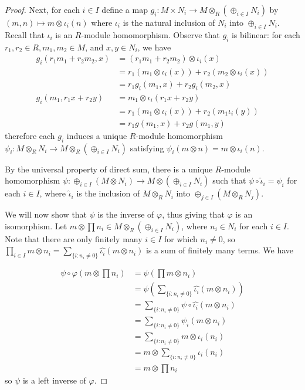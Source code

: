 \documentclass[10pt]{article}
\begin{document}
\begin{enumerate}
\begin{proof}
Next, for each $i \in I$ define a map $g_i: M \times N_i \rightarrow M \otimes_R (\oplus_{i \in I} N_i)$ by $(m, n) \mapsto m \otimes \iota_i (n)$ where $\iota_i$ is the natural inclusion of $N_i$ into $\oplus_{i \in I} N_i$.  Recall that $\iota_i$ is an $R$-module homomorphism.  Observe that $g_i$ is bilinear: for each $r_1, r_2 \in R, m_1, m_2 \in M$, and $x,y \in N_i$, we have
\begin{align*}
g_i(r_1m_1 + r_2m_2, x)
&=
(r_1m_1 + r_2m_2) \otimes \iota_i(x)
\\
&= r_1 \left( m_1 \otimes \iota_i(x) \right) + r_2 \left( m_2 \otimes \iota_i(x) \right)
\\
&= r_1 g_i(m_1, x) + r_2 g_i(m_2, x)
\\
g_i(m_1, r_1 x + r_2 y)
&=
m_1 \otimes \iota_i(r_1 x + r_2 y)
\\
&= r_1 \left( m_1 \otimes \iota_i(x) \right) + r_2 \left( m_1 \iota_i(y) \right)
\\
&= r_1 g(m_1, x) + r_2 g(m_1, y)
\end{align*}
therefore each $g_i$ induces a unique $R$-module homomorphism $\psi_i : M \otimes_R N_i \rightarrow M \otimes_R (\oplus_{i \in I} N_i)$ satisfying $\psi_i ( m \otimes n) = m \otimes \iota_i(n)$.

By the universal property of direct sum, there is a unique $R$-module homomorphism $\psi : \oplus_{i \in I} (M \otimes N_i) \rightarrow M \otimes (\oplus_{i \in I} N_i)$ such that $\psi \circ \hat{\iota}_i = \psi_i$ for each $i \in I$, where $\hat{\iota}_i$ is the inclusion of $M \otimes_R N_i$ into $\oplus_{j \in I} (M \otimes_R N_j)$.

We will now show that $\psi$ is the inverse of $\varphi$, thus giving that $\varphi$ is an isomorphism.  Let $m \otimes \prod n_i \in M \otimes_R (\oplus_{i \in I} N_i)$, where $n_i \in N_i$ for each $i \in I$.  Note that there are only finitely many $i \in I$ for which $n_i \neq 0$, so $\prod_{i \in I} m \otimes n_i = \sum\limits_{\{i  : n_i \neq 0 \}} \hat{\iota_i}(m \otimes n_i)$ is a sum of finitely many terms.  We have

\begin{align*}
\psi \circ \varphi \left( m \otimes \prod n_i \right)
&=
\psi \left( \prod m \otimes n_i \right)
\\
&= \psi \left( \sum\limits_{\{i  : n_i \neq 0 \}} \hat{\iota_i} (m \otimes n_i) \right)
\\
&= \sum\limits_{\{i  : n_i \neq 0 \}} \psi \circ \hat{\iota_i} (m \otimes n_i)
\\
&= \sum\limits_{\{i  : n_i \neq 0 \}} \psi_i (m \otimes n_i)
\\
&= \sum\limits_{\{i  : n_i \neq 0 \}} m \otimes \iota_i(n_i)
\\
&=  m \otimes \sum\limits_{\{i  : n_i \neq 0 \}} \iota_i (n_i)
\\
&= m \otimes \prod n_i
\end{align*}
so $\psi$ is a left inverse of $\varphi$.


\end{proof}
\end{enumerate}
\end{document}
